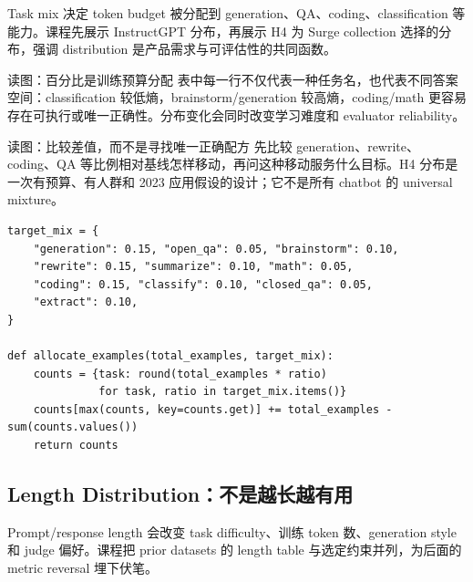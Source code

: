 Task mix 决定 token budget 被分配到 generation、QA、coding、classification 等能力。课程先展示 InstructGPT 分布，再展示 H4 为 Surge collection 选择的分布，强调 distribution 是产品需求与可评估性的共同函数。


\begin{knowledgebox}{读图：百分比是训练预算分配}
表中每一行不仅代表一种任务名，也代表不同答案空间：classification 较低熵，brainstorm/generation 较高熵，coding/math 更容易存在可执行或唯一正确性。分布变化会同时改变学习难度和 evaluator reliability。
\end{knowledgebox}


\begin{knowledgebox}{读图：比较差值，而不是寻找唯一正确配方}
先比较 generation、rewrite、coding、QA 等比例相对基线怎样移动，再问这种移动服务什么目标。H4 分布是一次有预算、有人群和 2023 应用假设的设计；它不是所有 chatbot 的 universal mixture。
\end{knowledgebox}


\begin{lstlisting}[caption={按目标比例分配有限 demonstration budget 的概念代码}]
target_mix = {
    "generation": 0.15, "open_qa": 0.05, "brainstorm": 0.10,
    "rewrite": 0.15, "summarize": 0.10, "math": 0.05,
    "coding": 0.15, "classify": 0.10, "closed_qa": 0.05,
    "extract": 0.10,
}

def allocate_examples(total_examples, target_mix):
    counts = {task: round(total_examples * ratio)
              for task, ratio in target_mix.items()}
    counts[max(counts, key=counts.get)] += total_examples - sum(counts.values())
    return counts
\end{lstlisting}

\subsection{Length Distribution：不是越长越有用}

Prompt/response length 会改变 task difficulty、训练 token 数、generation style 和 judge 偏好。课程把 prior datasets 的 length table 与选定约束并列，为后面的 metric reversal 埋下伏笔。

